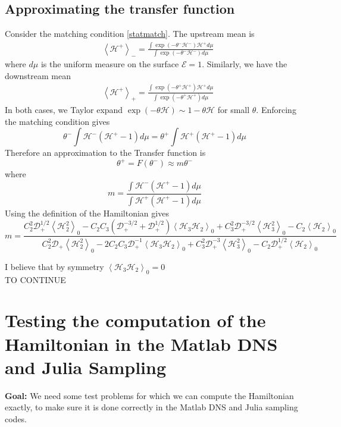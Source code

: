\documentclass[11pt]{article}
\newcommand{\vsp}[1]{\vspace{#1 pc} \noindent}
\newcommand{\seclabel}[1]{\vsp{1} {\bf#1:}}
\newcommand{\mean}[1]{\left< #1 \right>}
\newcommand{\drat}{\mathcal{D}}
\newcommand{\dratdn}{\drat_+}
\newcommand{\DD}{\dratdn}
\newcommand{\En}{\mathcal{E}}
\newcommand{\Ham}{\mathcal{H}}
\newcommand{\Hup}{\Ham^{-}}
\newcommand{\Hdn}{\Ham^{+}}
\newcommand{\Hthree}{\Ham_{3}}
\newcommand{\Htwo}{\Ham_{2}}
\newcommand{\thup}{\theta^{-}}
\newcommand{\thdn}{\theta^{+}}
\newcommand{\meanup}[1]{\mean{#1}_{-}}
\newcommand{\meandn}[1]{\mean{#1}_{+}}
\newcommand{\meanz}[1]{\mean{#1}_0}
\begin{document}
\subsection{Approximating the transfer function}
Consider the matching condition \eqref{statmatch}. The upstream mean is
\begin{align}
&\meanup{\Hdn} = \frac{\int \exp\left(-\thup \Hup\right) \Hdn d\mu}{ \int \exp\left(-\thup \Hup \right) d\mu}
\end{align}
where $d \mu$ is the uniform measure on the surface $\En=1$. Similarly, we have the downstream mean
\begin{align}
&\meandn{\Hdn} = \frac{\int \exp\left(-\thdn \Hdn\right) \Hdn d\mu}{ \int \exp\left(-\thdn \Hdn \right) d\mu}
\end{align}
In both cases, we Taylor expand $\exp(-\theta \Ham) \sim 1 - \theta \Ham$ for small $\theta$. Enforcing the matching condition gives
\begin{equation}
\thup \int \Hup (\Hdn -1 ) d\mu = \thdn \int \Hdn (\Hdn - 1) d\mu
\end{equation}
Therefore an approximation to the Transfer function is 
\begin{equation}
\thdn = F(\thup) \approx m \thup
\end{equation}
where
\begin{equation}
m = \frac{  \int \Hup (\Hdn -1 ) d\mu }{ \int \Hdn (\Hdn - 1) d\mu }
\end{equation}
Using the definition of the Hamiltonian gives
\begin{equation}
m = \frac{ C_2^2 \DD^{1/2} \meanz{\Htwo^2} 
	- C_2 C_3(\DD^{-3/2} + \DD^{1/2})  \meanz{\Hthree \Htwo} 
	+ C_3^2 \DD^{-3/2} \meanz{\Hthree^2} - C_2 \meanz{\Htwo}}
	{ C_2^2 \DD \meanz{\Htwo^2} 
	- 2 C_2 C_3 \DD^{-1} \meanz{\Hthree \Htwo} 
	+ C_3^2 \DD^{-3} \meanz{\Hthree^2} - C_2 \DD^{1/2} \meanz{\Htwo}}
\end{equation}

I believe that by symmetry $\meanz{\Hthree \Htwo} = 0$
\\ TO CONTINUE

\section{Testing the computation of the Hamiltonian in the Matlab DNS and Julia Sampling}

\seclabel{Goal} We need some test problems for which we can compute the Hamiltonian exactly, to make sure it is done correctly in the Matlab DNS and Julia sampling codes.
\end{document}
